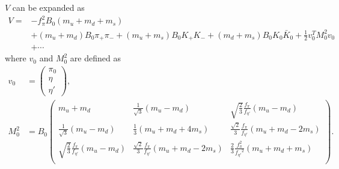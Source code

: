 \documentclass[11pt,a4paper]{article}
\begin{document}
$V$ can be expanded as
\begin{align}
    V =& -f_\pi^2 B_0 (m_u+m_d+m_s) \nonumber\\
    & + (m_u+m_d)B_0 \pi_+ \pi_- + (m_u+m_s)B_0 K_+ K_- + (m_d+m_s)B_0 K_0 \bar K_0 + \frac{1}{2} v_0^T M_0^2 v_0 \nonumber\\
    & + \cdots
\end{align}
where $v_0$ and $M_0^2$ are defined as
\begin{align}
    v_0 &= \left(\begin{array}{c} \pi_0 \\ \eta \\ \eta' \end{array}\right), \\
    M_0^2 &= B_0 \left(\begin{array}{ccc}
        m_u + m_d & \frac{1}{\sqrt 3}(m_u-m_d) & \sqrt{\frac{2}{3}} \frac{f_\pi}{f_{\eta'}}(m_u-m_d) \\
        \frac{1}{\sqrt 3}(m_u-m_d) & \frac{1}{3}(m_u+m_d+4m_s) & \frac{\sqrt 2}{3} \frac{f_\pi}{f_{\eta'}} (m_u+m_d-2m_s) \\
        \sqrt{\frac{2}{3}} \frac{f_\pi}{f_{\eta'}}(m_u-m_d) & \frac{\sqrt 2}{3} \frac{f_\pi}{f_{\eta'}} (m_u+m_d-2m_s) & \frac{2}{3}\frac{f_\pi^2}{{f_{\eta'}}^2}(m_u+m_d+m_s) \\
    \end{array}\right).
\end{align}
\end{document}
